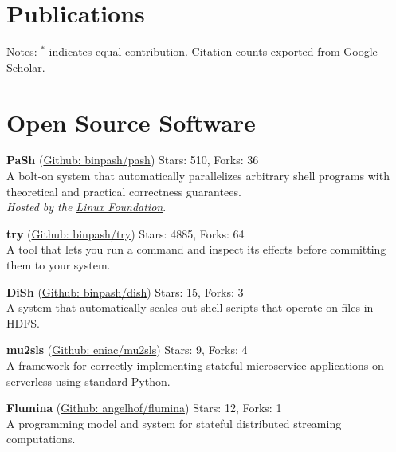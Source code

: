 \documentclass[margin]{res}
\begin{document}
\begin{resume}


\section{Publications}



Notes: $^*$ indicates equal contribution. Citation counts exported from Google Scholar.

\section{Open Source Software}

\textbf{PaSh} (\href{https://github.com/binpash/pash}{Github: binpash/pash}) Stars: 510, Forks: 36 \\
A bolt-on system that automatically parallelizes arbitrary shell programs with theoretical and practical correctness guarantees. \\
{\em Hosted by the \href{https://www.linuxfoundation.org/press-release/linux-foundation-to-host-the-pash-project-accelerating-shell-scripting-with-automated-parallelization-for-industrial-use-cases/}{Linux Foundation}}.

\textbf{try} (\href{https://github.com/binpash/try}{Github: binpash/try}) Stars: 4885, Forks: 64 \\
A tool that lets you run a command and inspect its effects before committing them to your system.

\textbf{DiSh} (\href{https://github.com/binpash/dish}{Github: binpash/dish}) Stars: 15, Forks: 3 \\
A system that automatically scales out shell scripts that operate on files in HDFS.

\textbf{mu2sls} (\href{https://github.com/eniac/mu2sls}{Github: eniac/mu2sls}) Stars: 9, Forks: 4 \\
A framework for correctly implementing stateful microservice applications on serverless using standard Python. 

\textbf{Flumina} (\href{https://github.com/angelhof/flumina}{Github: angelhof/flumina}) Stars: 12, Forks: 1 \\
A programming model and system for stateful distributed streaming computations.


\end{resume}
\end{document}

